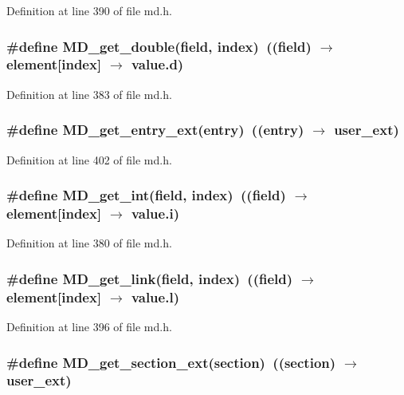 Definition at line 390 of file md.h.
\subsubsection{\setlength{\rightskip}{0pt plus 5cm}\#define MD\_\-get\_\-double(field, index)~((field) $\rightarrow$ element[index] $\rightarrow$ value.d)}\label{md_8h_649cf2eb5f9d69a1c2902fbb1718e63e}




Definition at line 383 of file md.h.
\subsubsection{\setlength{\rightskip}{0pt plus 5cm}\#define MD\_\-get\_\-entry\_\-ext(\bf{entry})~((\bf{entry}) $\rightarrow$ user\_\-ext)}\label{md_8h_81e16c0e641fcd4961ec220f5d482e8c}




Definition at line 402 of file md.h.
\subsubsection{\setlength{\rightskip}{0pt plus 5cm}\#define MD\_\-get\_\-int(field, index)~((field) $\rightarrow$ element[index] $\rightarrow$ value.i)}\label{md_8h_4d8e575b183c6a55bec1296f8a890db6}




Definition at line 380 of file md.h.
\subsubsection{\setlength{\rightskip}{0pt plus 5cm}\#define MD\_\-get\_\-link(field, index)~((field) $\rightarrow$ element[index] $\rightarrow$ value.l)}\label{md_8h_fd7bc44d273ab835db24cfb8ad5f31a6}




Definition at line 396 of file md.h.
\subsubsection{\setlength{\rightskip}{0pt plus 5cm}\#define MD\_\-get\_\-section\_\-ext(section)~((section) $\rightarrow$ user\_\-ext)}\label{md_8h_8a7206e5263d2a363630e378dba39803}




